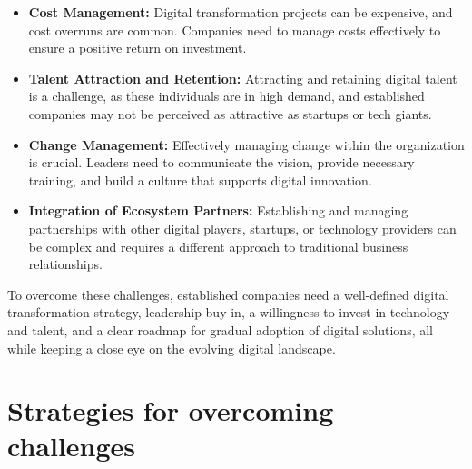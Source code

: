 \documentclass[a4]{scrartcl}
\begin{document}
\begin{itemize}
		\item \textbf{Cost Management:} Digital transformation projects can be expensive, and cost overruns are common. Companies need to manage costs effectively to ensure a positive return on investment.
		
		\item \textbf{Talent Attraction and Retention:} Attracting and retaining digital talent is a challenge, as these individuals are in high demand, and established companies may not be perceived as attractive as startups or tech giants.
		
		\item \textbf{Change Management:} Effectively managing change within the organization is crucial. Leaders need to communicate the vision, provide necessary training, and build a culture that supports digital innovation.
		
		\item \textbf{Integration of Ecosystem Partners:} Establishing and managing partnerships with other digital players, startups, or technology providers can be complex and requires a different approach to traditional business relationships.
	\end{itemize}
	
	To overcome these challenges, established companies need a well-defined digital transformation strategy, leadership buy-in, a willingness to invest in technology and talent, and a clear roadmap for gradual adoption of digital solutions, all while keeping a close eye on the evolving digital landscape.
	










\newpage
\section{Strategies for overcoming challenges} \label{sec:Sec3}












	
\newpage
{}
\begin{spacing}{0.9}
	\printbibliography
\end{spacing}


	
	
	
	
	
	
\end{document}
